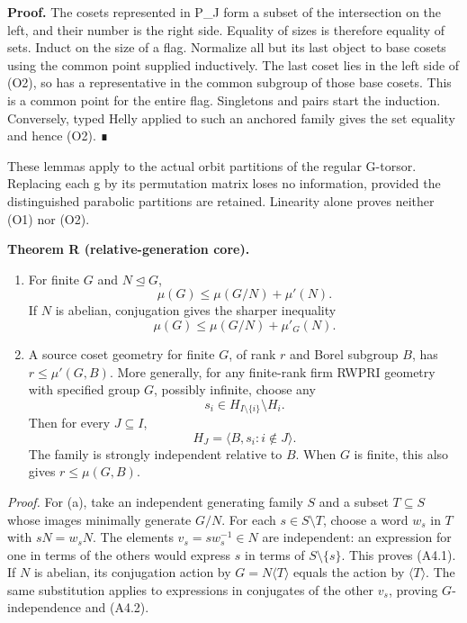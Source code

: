 \documentclass[
  10pt,
  letterpaper,
]{article}
\begin{document}
\textbf{Proof.} The cosets represented in P\_J form a subset of the
intersection on the left, and their number is the right side. Equality
of sizes is therefore equality of sets. Induct on the size of a flag.
Normalize all but its last object to base cosets using the common point
supplied inductively. The last coset lies in the left side of (O2), so
has a representative in the common subgroup of those base cosets. This
is a common point for the entire flag. Singletons and pairs start the
induction. Conversely, typed Helly applied to such an anchored family
gives the set equality and hence (O2). ∎

These lemmas apply to the actual orbit partitions of the regular
G-torsor. Replacing each g by its permutation matrix loses no
information, provided the distinguished parabolic partitions are
retained. Linearity alone proves neither (O1) nor (O2).

\textbf{Theorem R (relative-generation core).}

\begin{enumerate}
\def\labelenumi{(\alph{enumi})}
\item
  For finite \(G\) and \(N\unlhd G\), \[
  \mu(G)\leq\mu(G/N)+\mu'(N).
  \tag{A4.1}
  \] If \(N\) is abelian, conjugation gives the sharper inequality \[
  \mu(G)\leq\mu(G/N)+\mu'_G(N).
  \tag{A4.2}
  \]
\item
  A source coset geometry for finite \(G\), of rank \(r\) and Borel
  subgroup \(B\), has \(r\leq\mu'(G,B)\). More generally, for any
  finite-rank firm RWPRI geometry with specified group \(G\), possibly
  infinite, choose any \[
  s_i\in H_{I\setminus\{i\}}\setminus H_i.
  \tag{A4.3}
  \] Then for every \(J\subseteq I\), \[
  H_J=\langle B,s_i:i\notin J\rangle.
  \tag{A4.4}
  \] The family is strongly independent relative to \(B\). When \(G\) is
  finite, this also gives \(r\leq\mu(G,B)\).
\end{enumerate}

\emph{Proof.} For (a), take an independent generating family \(S\) and a
subset \(T\subseteq S\) whose images minimally generate \(G/N\). For
each \(s\in S\setminus T\), choose a word \(w_s\) in \(T\) with
\(sN=w_sN\). The elements \(v_s=sw_s^{-1}\in N\) are independent: an
expression for one in terms of the others would express \(s\) in terms
of \(S\setminus\{s\}\). This proves (A4.1). If \(N\) is abelian, its
conjugation action by \(G=N\langle T\rangle\) equals the action by
\(\langle T\rangle\). The same substitution applies to expressions in
conjugates of the other \(v_s\), proving \(G\)-independence and (A4.2).
\end{document}
